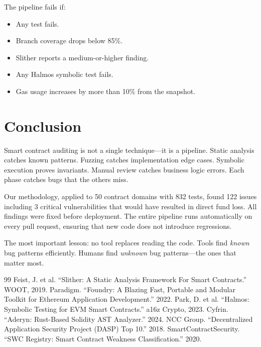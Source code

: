 \documentclass[11pt,a4paper]{article}
\begin{document}
The pipeline fails if:
\begin{itemize}[nosep]
  \item Any test fails.
  \item Branch coverage drops below 85\%.
  \item Slither reports a medium-or-higher finding.
  \item Any Halmos symbolic test fails.
  \item Gas usage increases by more than 10\% from the snapshot.
\end{itemize}

\section{Conclusion}

Smart contract auditing is not a single technique---it is a pipeline. Static analysis
catches known patterns. Fuzzing catches implementation edge cases. Symbolic execution
proves invariants. Manual review catches business logic errors. Each phase catches bugs
that the others miss.

Our methodology, applied to 50 contract domains with 832 tests, found 122 issues
including 3 critical vulnerabilities that would have resulted in direct fund loss.
All findings were fixed before deployment. The entire pipeline runs automatically on
every pull request, ensuring that new code does not introduce regressions.

The most important lesson: no tool replaces reading the code. Tools find \emph{known}
bug patterns efficiently. Humans find \emph{unknown} bug patterns---the ones that matter
most.

\begin{thebibliography}{99}
 Feist, J. et al. ``Slither: A Static Analysis Framework For Smart Contracts.'' WOOT, 2019.
 Paradigm. ``Foundry: A Blazing Fast, Portable and Modular Toolkit for Ethereum Application Development.'' 2022.
 Park, D. et al. ``Halmos: Symbolic Testing for EVM Smart Contracts.'' a16z Crypto, 2023.
 Cyfrin. ``Aderyn: Rust-Based Solidity AST Analyzer.'' 2024.
 NCC Group. ``Decentralized Application Security Project (DASP) Top 10.'' 2018.
 SmartContractSecurity. ``SWC Registry: Smart Contract Weakness Classification.'' 2020.
\end{thebibliography}
\end{document}
